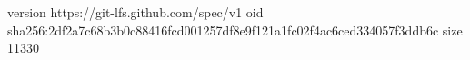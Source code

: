 version https://git-lfs.github.com/spec/v1
oid sha256:2df2a7c68b3b0c88416fcd001257df8e9f121a1fc02f4ac6ced334057f3ddb6c
size 11330
